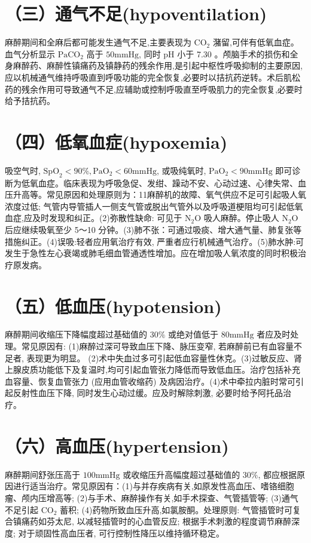 \documentclass[10pt]{article}
\begin{document}
\section*{（三）通气不足(hypoventilation)}
麻醉期间和全麻后都可能发生通气不足,主要表现为 $\mathrm{CO}_{2}$ 潴留,可伴有低氧血症。血气分析显示 $\mathrm{PaCO}_{2}$ 高于 $50 \mathrm{mmHg}$, 同时 $\mathrm{pH}$ 小于 7.30 。颅脑手术的损伤和全身麻醉药、麻醉性镇痛药及镇静药的残余作用,是引起中枢性呼吸抑制的主要原因,应以机械通气维持呼吸直到呼吸功能的完全恢复,必要时以拮抗药逆转。术后肌松药的残余作用可导致通气不足,应辅助或控制呼吸直至呼吸肌力的完全恢复,必要时给予拮抗药。

\section*{（四）低氧血症(hypoxemia)}
吸空气时, $\mathrm{SpO}_{2}<90 \%, \mathrm{PaO}_{2}<60 \mathrm{mmHg}$, 或吸纯氧时, $\mathrm{PaO}_{2}<90 \mathrm{mmHg}$ 即可诊断为低氧血症。临床表现为呼吸急促、发绀、躁动不安、心动过速、心律失常、血压升高等。常见原因和处理原则为：11麻醉机的故障、氧气供应不足可引起吸人氧浓度过低; 气管内导管插人一侧支气管或脱出气管外以及呼吸道梗阻均可引起低氧血症,应及时发现和纠正。(2)弥散性缺命: 可见于 $\mathrm{N}_{2} \mathrm{O}$ 吸人麻醉。停止吸人 $\mathrm{N}_{2} \mathrm{O}$ 后应继续吸氧至少 5～10 分钟。(3)肺不张：可通过吸痰、增大通气量、肺复张等措施纠正。(4)误吸:轻者应用氧治疗有效, 严重者应行机械通气治疗。(5)肺水肿:可发生于急性左心衰竭或肺毛细血管通透性增加。应在增加吸人氧浓度的同时积极治疗原发病。

\section*{（五）低血压(hypotension)}
麻醉期间收缩压下降幅度超过基础值的 $30 \%$ 或绝对值低于 $80 \mathrm{mmHg}$ 者应及时处理。常见原因有: (1)麻醉过深可导致血压下降、脉压变窄, 若麻醉前已有血容量不足者, 表现更为明显。 (2)术中失血过多可引起低血容量性休克。(3)过敏反应、肾上腺皮质功能低下及复温时,均可引起血管张力降低而导致低血压。治疗包括补充血容量、恢复血管张力 (应用血管收缩药) 及病因治疗。(4)术中牵拉内脏时常可引起反射性血压下降, 同时发生心动过缓。应及时解除刺激, 必要时给予阿托品治疗。

\section*{（六）高血压(hypertension)}
麻醉期间舒张压高于 $100 \mathrm{mmHg}$ 或收缩压升高幅度超过基础值的 $30 \%$, 都应根据原因进行适当治疗。常见原因有：(1)与并存疾病有关,如原发性高血压、嗜铬细胞瘤、颅内压增高等; (2)与手术、麻醉操作有关,如手术探查、气管插管等; (3)通气不足引起 $\mathrm{CO}_{2}$ 蓄积; (4)药物所致血压升高,如氯胺酮。处理原则: 气管插管时可复合镇痛药如芬太尼, 以减轻插管时的心血管反应; 根据手术刺激的程度调节麻醉深度; 对于顽固性高血压者, 可行控制性降压以维持循环稳定。
\end{document}
